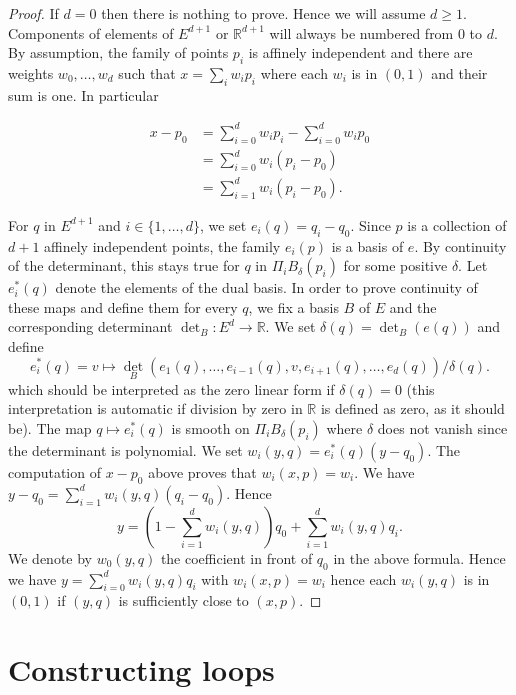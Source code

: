 \begin{proof}
  If $d = 0$ then there is nothing to prove.
  Hence we will assume $d ≥ 1$.
  Components of elements of $E^{d+1}$ or $ℝ^{d+1}$ will always be
  numbered from $0$ to $d$.
  By assumption, the family of points $p_i$ is affinely independent and
  there are weights $w_0, \dots, w_d$ such that $x = \sum_i w_i p_i$
  where each $w_i$ is in $(0, 1)$ and their sum is one.
  In particular

  \begin{align*}
    x - p_0 &= \sum_{i=0}^d w_i p_i - \sum_{i=0}^d w_i p_0 \\
            & = \sum_{i=0}^d w_i (p_i - p_0) \\
            & = \sum_{i=1}^d w_i (p_i - p_0).
  \end{align*}

  For $q$ in $E^{d+1}$ and $i ∈ \{1, \dots, d\}$, we set
  $e_i(q) = q_i - q_0$.
  Since $p$ is a collection of $d+1$ affinely independent points,
  the family $e_i(p)$ is a basis of $e$.
  By continuity of the determinant, this stays true
  for $q$ in $Π_i B_δ(p_i)$ for some positive $δ$.
  Let $e^*_i(q)$ denote the elements of the dual basis.
  In order to prove continuity of these maps and define them
  for every $q$, we fix a basis $B$ of $E$ and the corresponding
  determinant $\det_B : E^d → ℝ$.
  We set $δ(q) = \det_B(e(q))$ and define
  \[
    e^*_i(q) = v ↦
    \det_B(e_1(q), \dots, e_{i-1}(q), v, e_{i+1}(q), \dots, e_d(q))/δ(q).
  \]
  which should be interpreted as the zero linear form if $δ(q) = 0$
  (this interpretation is automatic if division by zero in $ℝ$
  is defined as zero, as it should be).
  The map $q ↦ e^*_i(q)$ is smooth on $Π_i B_δ(p_i)$
  where $δ$ does not vanish since the determinant is polynomial.
  We set $w_i(y, q) = e^*_i(q)(y - q_0)$.
  The computation of $x - p_0$ above proves that
  $w_i(x, p) = w_i$.
  We have $y - q_0 = \sum_{i = 1}^d w_i(y, q)(q_i - q_0)$.
  Hence
  \[
    y = \left(1 - \sum_{i = 1}^d w_i(y, q)\right)q_0 +
        \sum_{i = 1}^d w_i(y, q)q_i.
  \]
  We denote by $w_0(y, q)$ the coefficient in front of $q_0$ in the
  above formula.
  Hence we have $y = \sum_{i=0}^d w_i(y, q)q_i$ with
  $w_i(x, p) = w_i$ hence each $w_i(y, q)$ is in $(0, 1)$
  if $(y, q)$ is sufficiently close to $(x, p)$.
\end{proof}

\section{Constructing loops}

